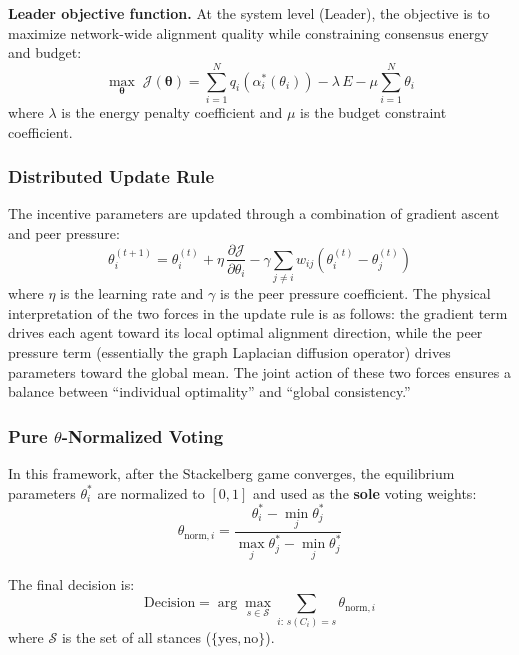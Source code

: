 \documentclass[12pt,a4paper]{article}
\begin{document}
\textbf{Leader objective function.} At the system level (Leader), the objective is to maximize network-wide alignment quality while constraining consensus energy and budget:
\begin{equation}\label{eq:leader}
\max_{\boldsymbol\theta}\; \mathcal{J}(\boldsymbol\theta) = \sum_{i=1}^N q_i(\alpha_i^*(\theta_i)) - \lambda\,E - \mu \sum_{i=1}^N \theta_i
\end{equation}
where $\lambda$ is the energy penalty coefficient and $\mu$ is the budget constraint coefficient.

\subsubsection{Distributed Update Rule}

The incentive parameters are updated through a combination of gradient ascent and peer pressure:
\begin{equation}\label{eq:theta_update}
\theta_i^{(t+1)} = \theta_i^{(t)} + \eta\,\frac{\partial \mathcal{J}}{\partial \theta_i} - \gamma \sum_{j \neq i} w_{ij}(\theta_i^{(t)} - \theta_j^{(t)})
\end{equation}
where $\eta$ is the learning rate and $\gamma$ is the peer pressure coefficient. The physical interpretation of the two forces in the update rule is as follows: the gradient term drives each agent toward its local optimal alignment direction, while the peer pressure term (essentially the graph Laplacian diffusion operator) drives parameters toward the global mean. The joint action of these two forces ensures a balance between ``individual optimality'' and ``global consistency.''

\subsubsection{Pure $\theta$-Normalized Voting}

In this framework, after the Stackelberg game converges, the equilibrium parameters $\theta_i^*$ are normalized to $[0,1]$ and used as the \textbf{sole} voting weights:
\begin{equation}\label{eq:theta_norm}
\theta_{\text{norm},i} = \frac{\theta_i^* - \min_j \theta_j^*}{\max_j \theta_j^* - \min_j \theta_j^*}
\end{equation}

The final decision is:
\begin{equation}\label{eq:decision}
\text{Decision} = \arg\max_{s \in \mathcal{S}} \sum_{i:\, s(C_i)=s} \theta_{\text{norm},i}
\end{equation}
where $\mathcal{S}$ is the set of all stances ($\{\text{yes}, \text{no}\}$).
\end{document}
